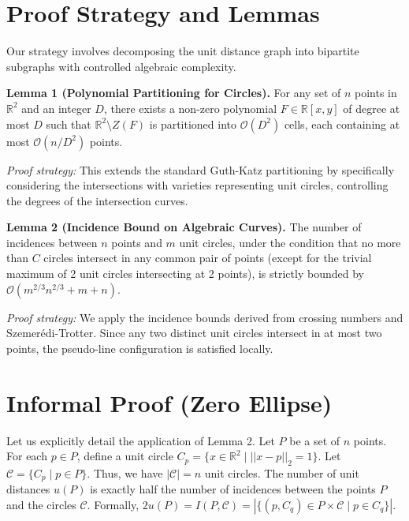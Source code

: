 \documentclass[11pt,a4paper]{article}
\begin{document}
\section{Proof Strategy and Lemmas}
Our strategy involves decomposing the unit distance graph into bipartite subgraphs with controlled algebraic complexity.

\textbf{Lemma 1 (Polynomial Partitioning for Circles).}
For any set of $n$ points in $\mathbb{R}^2$ and an integer $D$, there exists a non-zero polynomial $F \in \mathbb{R}[x,y]$ of degree at most $D$ such that $\mathbb{R}^2 \setminus Z(F)$ is partitioned into $\mathcal{O}(D^2)$ cells, each containing at most $\mathcal{O}(n/D^2)$ points.

\textit{Proof strategy:} This extends the standard Guth-Katz partitioning by specifically considering the intersections with varieties representing unit circles, controlling the degrees of the intersection curves.

\textbf{Lemma 2 (Incidence Bound on Algebraic Curves).}
The number of incidences between $n$ points and $m$ unit circles, under the condition that no more than $C$ circles intersect in any common pair of points (except for the trivial maximum of 2 unit circles intersecting at 2 points), is strictly bounded by $\mathcal{O}(m^{2/3}n^{2/3} + m + n)$.

\textit{Proof strategy:} We apply the incidence bounds derived from crossing numbers and Szemerédi-Trotter. Since any two distinct unit circles intersect in at most two points, the pseudo-line configuration is satisfied locally.

\section{Informal Proof (Zero Ellipse)}

Let us explicitly detail the application of Lemma 2.
Let $P$ be a set of $n$ points. For each $p \in P$, define a unit circle $C_p = \{x \in \mathbb{R}^2 \mid ||x - p||_2 = 1\}$.
Let $\mathcal{C} = \{C_p \mid p \in P\}$. Thus, we have $|\mathcal{C}| = n$ unit circles.
The number of unit distances $u(P)$ is exactly half the number of incidences between the points $P$ and the circles $\mathcal{C}$. Formally, $2 u(P) = I(P, \mathcal{C}) = |\{(p, C_q) \in P \times \mathcal{C} \mid p \in C_q\}|$.
\end{document}
